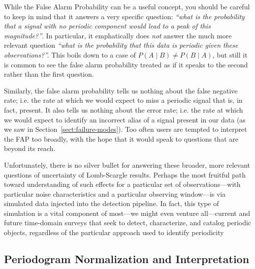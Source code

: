 \documentclass[preprint]{aastex}
\newcommand{\Sect}[1]{Section~\ref{sect:#1}}
\newcommand{\sect}[1]{\Sect{#1}}
\newcommand{\sectlabel}[1]{\label{sect:#1}}
\begin{document}
\sectlabel{what-FAP-measures}

While the False Alarm Probability can be a useful concept, you should be
careful to keep in mind that it answers a very specific question:
{\it ``what is the probability that a signal with no periodic component would
  lead to a peak of this magnitude?''}.
In particular, it emphatically does {\it not} answer the much more relevant
question {\it ``what is the probability that this data is periodic
  given these observations?''.}
This boils down to a case of $P(A \mid B) \ne P(B \mid A)$,
but still it is common to see the false alarm probability
treated as if it speaks to the second rather than the first question.

Similarly, the false alarm probability tells us nothing about the false
negative rate; {i.e.} the rate at which
we would expect to miss a periodic signal that is, in fact, present.
It also tells us nothing about the error rate; {i.e.} the rate at which we
would expect to identify an incorrect alias of a signal present in our data
(as we saw in \sect{failure-modes}).
Too often users are tempted to interpret the FAP too broadly, with the hope that
it would speak to questions that are beyond its reach.

Unfortunately, there is no silver bullet for answering
these broader, more relevant questions of uncertainty of Lomb-Scargle results.
Perhaps the most fruitful path toward understanding of such effects for a
particular set of observations---with particular noise characteristics and a
particular observing window---is via simulated data injected into the detection
pipeline.
In fact, this type of simulation is a vital component of most---we might even
venture all---current and future time-domain surveys that seek to
detect, characterize, and catalog periodic objects,
regardless of the particular approach used to identify periodicity
\citep[see, e.g.][etc.]{opsim1, opsim2, Ivezic08LSST, Sesar2010,
  Oluseyi12, McQuillan2012, Drake2014}



\subsection{Periodogram Normalization and Interpretation}
\sectlabel{normalizations}
\end{document}
